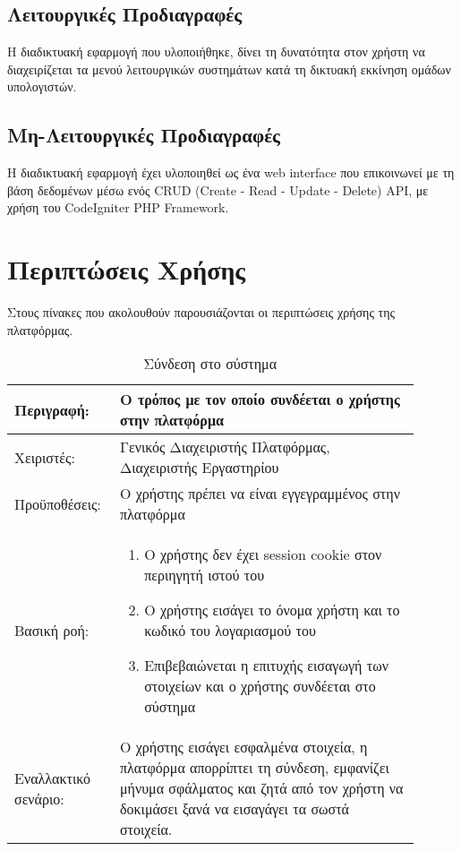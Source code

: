 \subsection{Λειτουργικές Προδιαγραφές}
Η διαδικτυακή εφαρμογή που υλοποιήθηκε, δίνει τη δυνατότητα στον χρήστη να διαχειρίζεται τα μενού λειτουργικών συστημάτων κατά τη δικτυακή εκκίνηση ομάδων υπολογιστών.

\subsection{Μη-Λειτουργικές Προδιαγραφές}
Η διαδικτυακή εφαρμογή έχει υλοποιηθεί ως ένα web interface που επικοινωνεί με τη βάση δεδομένων μέσω ενός CRUD (Create - Read - Update - Delete) API, με χρήση του CodeIgniter PHP Framework.

\section{Περιπτώσεις Χρήσης}
Στους πίνακες που ακολουθούν παρουσιάζονται οι περιπτώσεις χρήσης της πλατφόρμας.

\begin{table}[h]
	\caption{Σύνδεση στο σύστημα}
	\label{tab:use-case-login}
	\begin{tabular}{|p{0.2\linewidth}|p{0.7\linewidth}|}
		\hline
		Περιγραφή: & Ο τρόπος με τον οποίο συνδέεται ο χρήστης στην πλατφόρμα \\ \hline
		Χειριστές: & Γενικός Διαχειριστής Πλατφόρμας, Διαχειριστής Εργαστηρίου \\ \hline
		Προϋποθέσεις: & Ο χρήστης πρέπει να είναι εγγεγραμμένος στην πλατφόρμα \\ \hline
		Βασική ροή: & 
		\vspace{-0.5cm}
		\begin{enumerate}
			\item Ο χρήστης δεν έχει session cookie στον περιηγητή ιστού του
			\item Ο χρήστης εισάγει το όνομα χρήστη και το κωδικό του λογαριασμού του
			\item Επιβεβαιώνεται η επιτυχής εισαγωγή των στοιχείων και ο χρήστης συνδέεται στο σύστημα
		\end{enumerate}\vspace{-0.7cm} \\ \hline
		Εναλλακτικό σενάριο: & O χρήστης εισάγει εσφαλμένα στοιχεία, η πλατφόρμα απορρίπτει τη σύνδεση, εμφανίζει μήνυμα σφάλματος και ζητά από τον χρήστη να δοκιμάσει ξανά να εισαγάγει τα σωστά στοιχεία. \\ \hline
	\end{tabular}
\end{table}

